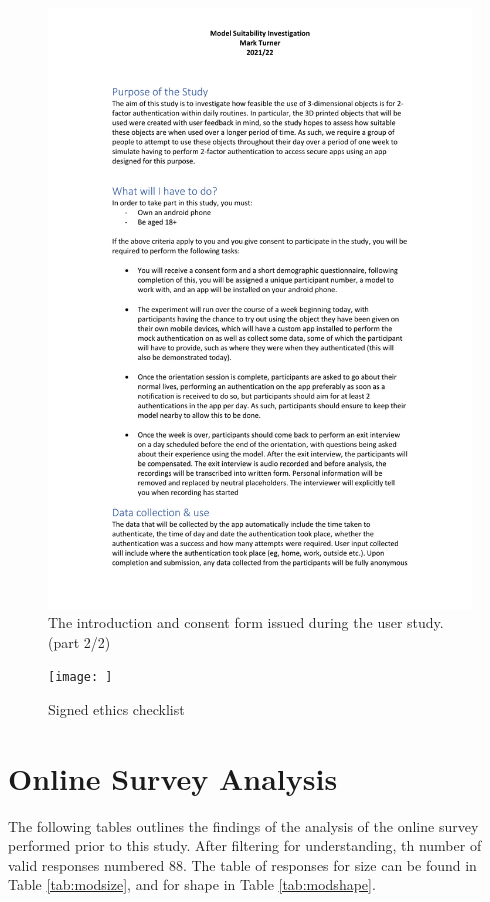 \documentclass{l4proj}
\begin{document}
\begin{appendices}
\begin{figure}
    \includegraphics[page=2,width=\linewidth]{Appendices/introduction_script_and_consent_form.pdf}
    \caption{The introduction and consent form issued during the user study. (part 2/2)}
    \label{fig:intro2}
\end{figure}

\begin{figure}
    \texttt{[image: ]}
    \caption{Signed ethics checklist}
    \label{fig:ethics}
\end{figure}

\newpage

\chapter{Online Survey Analysis}
\label{sec:onlineana}

The following tables outlines the findings of the analysis of the online survey performed prior to this study. After filtering for understanding, th number of valid responses numbered 88. The table of responses for size can be found in Table \ref{tab:modsize}, and for shape in Table \ref{tab:modshape}.


\end{appendices}
\end{document}
